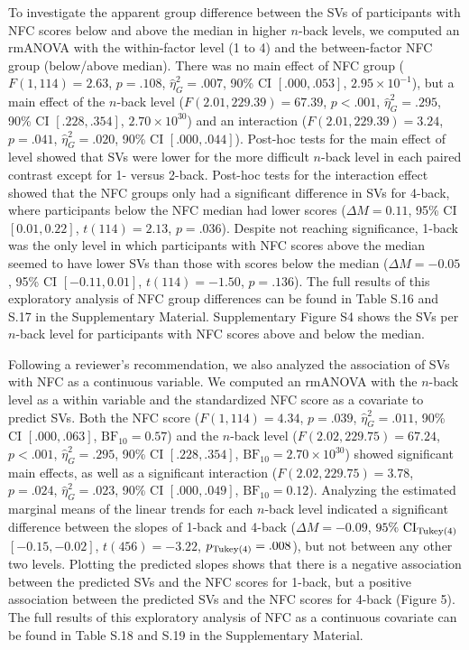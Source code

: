 \documentclass[
  man,floatsintext]{apa6}
\begin{document}
To investigate the apparent group difference between the SVs of participants with NFC scores below and above the median in higher \(n\)-back levels, we computed an rmANOVA with the within-factor level (1 to 4) and the between-factor NFC group (below/above median).
There was no main effect of NFC group (\(F(1, 114) = 2.63\), \(p = .108\), \(\hat{\eta}^2_G = .007\), 90\% CI \([.000, .053]\), \(2.95 \times 10^{-1}\)), but a main effect of the \(n\)-back level (\(F(2.01, 229.39) = 67.39\), \(p < .001\), \(\hat{\eta}^2_G = .295\), 90\% CI \([.228, .354]\), \(2.70 \times 10^{30}\)) and an interaction (\(F(2.01, 229.39) = 3.24\), \(p = .041\), \(\hat{\eta}^2_G = .020\), 90\% CI \([.000, .044]\)).
Post-hoc tests for the main effect of level showed that SVs were lower for the more difficult \(n\)-back level in each paired contrast except for 1- versus 2-back.
Post-hoc tests for the interaction effect showed that the NFC groups only had a significant difference in SVs for 4-back, where participants below the NFC median had lower scores (\(\Delta M = 0.11\), 95\% CI \([0.01, 0.22]\), \(t(114) = 2.13\), \(p = .036\)).
Despite not reaching significance, 1-back was the only level in which participants with NFC scores above the median seemed to have lower SVs than those with scores below the median (\(\Delta M = -0.05\), 95\% CI \([-0.11, 0.01]\), \(t(114) = -1.50\), \(p = .136\)).
The full results of this exploratory analysis of NFC group differences can be found in Table S.16 and S.17 in the Supplementary Material.
Supplementary Figure S4 shows the SVs per \(n\)-back level for participants with NFC scores above and below the median.

Following a reviewer's recommendation, we also analyzed the association of SVs with NFC as a continuous variable.
We computed an rmANOVA with the \(n\)-back level as a within variable and the standardized NFC score as a covariate to predict SVs.
Both the NFC score (\(F(1, 114) = 4.34\), \(p = .039\), \(\hat{\eta}^2_G = .011\), 90\% CI \([.000, .063]\), \(\mathrm{BF}_{\textrm{10}} = 0.57\)) and the \(n\)-back level (\(F(2.02, 229.75) = 67.24\), \(p < .001\), \(\hat{\eta}^2_G = .295\), 90\% CI \([.228, .354]\), \(\mathrm{BF}_{\textrm{10}} = 2.70 \times 10^{30}\)) showed significant main effects, as well as a significant interaction (\(F(2.02, 229.75) = 3.78\), \(p = .024\), \(\hat{\eta}^2_G = .023\), 90\% CI \([.000, .049]\), \(\mathrm{BF}_{\textrm{10}} = 0.12\)).
Analyzing the estimated marginal means of the linear trends for each \(n\)-back level indicated a significant difference between the slopes of 1-back and 4-back (\(\Delta M = -0.09\), \(95\%\ \mathrm{CI}_\mathrm{\scriptsize Tukey(4)}\) \([-0.15, -0.02]\), \(t(456) = -3.22\), \(p_\mathrm{\scriptsize Tukey(4)} = .008\)), but not between any other two levels.
Plotting the predicted slopes shows that there is a negative association between the predicted SVs and the NFC scores for 1-back, but a positive association between the predicted SVs and the NFC scores for 4-back (Figure 5).
The full results of this exploratory analysis of NFC as a continuous covariate can be found in Table S.18 and S.19 in the Supplementary Material.
\end{document}
